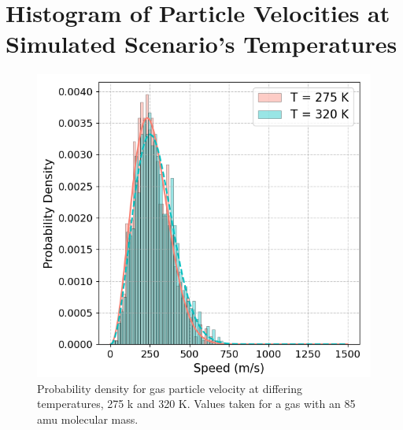 \documentclass[%
 reprint,
 amsmath,amssymb,
 aps,
]{revtex4-2}
\begin{document}
\section{Histogram of Particle Velocities at Simulated Scenario's Temperatures}

\begin{figure}[H]
	\caption{Probability density for gas particle velocity at differing temperatures, 275 k and 320 K. Values taken for a gas with an 85 amu molecular mass. }	
	\centering
	\includegraphics[scale=0.5]{appendix2.png}
\end{figure}

\nocite{*}

\end{document}
